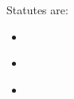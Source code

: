 \documentclass[english]{article}
\begin{document}
Statutes are:

\begin{itemize}
\item \cite{fdcstatute}
\item \cite{lanhamact}
\item \cite{communicationsact}
\end{itemize}

\printbibliography[title={Table of Statutes}]
\end{document}
